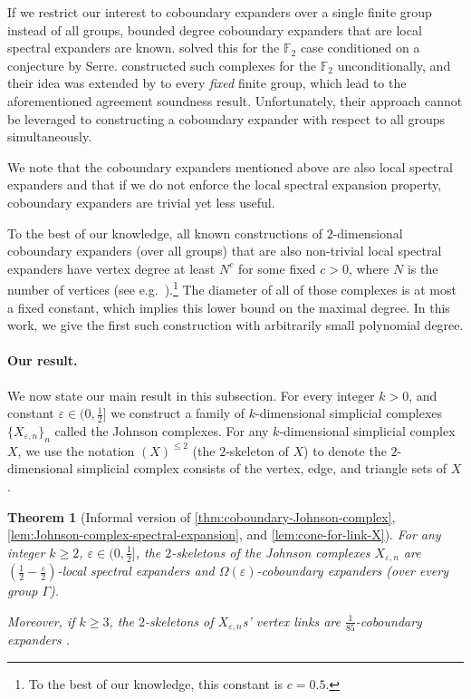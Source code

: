 \documentclass[10pt,a4paper]{article}
\newcommand{\prettyref}[1]{\cref{#1}}
\newtheorem{theorem}{Theorem}[section]
\theoremstyle{definition}
\theoremstyle{remark}
\newcommand{\Authornotecolored}[3]{{\sffamily\small\color{#1}{[#2: #3]}}}
\newcommand{\Authornotecolored}[3]{}
\newcommand{\Ynote}{\Authornotecolored{Purple}{Y}}
\newcommand{\F}{\mathbb{F}}
\renewcommand{\le}{\leqslant}
\renewcommand{\ge}{\geqslant}
\numberwithin{equation}{section}
\let\origparagraph\paragraph
\renewcommand{\paragraph}[1]{\origparagraph{#1.}}
\let\pref=\prettyref
\begin{document}
If we restrict our interest to coboundary expanders over a single finite group instead of all groups, bounded degree coboundary expanders that are local spectral expanders are known. \cite{KaufmanKL2016} solved this for the \(\F_2\) case conditioned on a conjecture by Serre. \cite{ChapmanL2023} constructed such complexes for the \(\F_2\) unconditionally, and their idea was extended by \cite{DiksteinDL2024,BafnaM2024} to every \emph{fixed} finite group, which lead to the aforementioned agreement soundness result. Unfortunately, their approach cannot be leveraged to constructing a coboundary expander with respect to all groups simultaneously.

 We note that the coboundary expanders mentioned above are also local spectral expanders and that if we do not enforce the local spectral expansion property, coboundary expanders are trivial yet less useful.
 
 \Ynote{Please make sure my footnote is correct}To the best of our knowledge, all known constructions of $2$-dimensional coboundary expanders (over all groups) that are also non-trivial local spectral expanders have vertex degree at least $N^{c}$ for some fixed $c>0$, where $N$ is the number of vertices (see e.g.\ \cite{LubotzkySV2005,kaufmanO2018}).\footnote{To the best of our knowledge, this constant is \(c=0.5\).} The diameter of all of those complexes is at most a fixed constant, which implies this lower bound on the maximal degree. In this work, we give the first such construction with arbitrarily small polynomial degree.

\paragraph{Our result} We now state our main result in this subsection. For every integer $k>0$, and constant $\varepsilon \in (0,\frac{1}{2}]$ we construct a family of $k$-dimensional simplicial complexes $\{X_{\varepsilon,n}\}_n$ called the Johnson complexes. For any $k$-dimensional simplicial complex $X$, we use the notation $(X)^{\le 2}$ (the $2$-skeleton of $X$) to denote the $2$-dimensional simplicial complex consists of the vertex, edge, and triangle sets of $X$.

\begin{theorem}[Informal version of \pref{thm:coboundary-Johnson-complex}, \pref{lem:Johnson-complex-spectral-expansion}, and \pref{lem:cone-for-link-X}] \label{thm:inf-Johnson-complex-expansions}
For any integer $k\ge 2$, $\varepsilon \in (0,\frac{1}{2}]$, the $2$-skeletons of the Johnson complexes $X_{\varepsilon,n}$ are $\left(\frac{1}{2} - \frac{\varepsilon}{2}\right)$-local spectral expanders and $\Omega(\varepsilon)$-coboundary expanders (over every group $\Gamma$).

Moreover, if $k\ge 3$, the $2$-skeletons of $X_{\varepsilon,n}$s' vertex links are $\frac{1}{85}$-coboundary expanders . 
\end{theorem}
\end{document}
